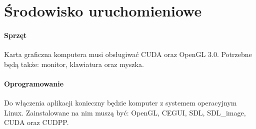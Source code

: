 \section{Środowisko uruchomieniowe}

\paragraph{Sprzęt}
Karta graficzna komputera musi obsługiwać CUDA oraz OpenGL 3.0. Potrzebne będą także: monitor, klawiatura oraz myszka.

\paragraph{Oprogramowanie}
Do włączenia aplikacji konieczny będzie komputer z systemem operacyjnym Linux. Zainstalowane na nim muszą być: OpenGL, CEGUI, SDL, SDL\_image, CUDA oraz CUDPP.


